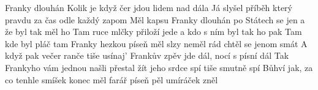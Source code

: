 \begin{TEXT}{Franky dlouhán}
\SLOKA Kolik je  když  čer jdou \NL
lidem nad   dála \NL
Já slyšel příběh který  pravdu  \NL
za čas odle  každý zapom 
\REFREN  Měl kapsu  Franky dlouhán \NL
po Státech  se jen  \NL
a že byl  tak  měl ho  \NL
Tam ruce  mlčky přiloží \NL
{} jede  \NL
a  kdo s ním  byl \NL
tak ho  pak  
\SLOKA Tam kde byl pláč tam Franky hezkou píseň měl \NL
slzy neměl rád chtěl se jenom smát \NL
A když pak večer ranče tiše usínaj' \NL
Frankův zpěv jde dál, nocí s písní dál 
\SLOKA Tak Frankyho vám jednou našli přestal žít \NL
jeho srdce spí tiše smutně spí \NL
Bůhví jak, za co tenhle smíšek konec měl \NL
farář píseň pěl umíráček zněl \NL
\end{TEXT}
